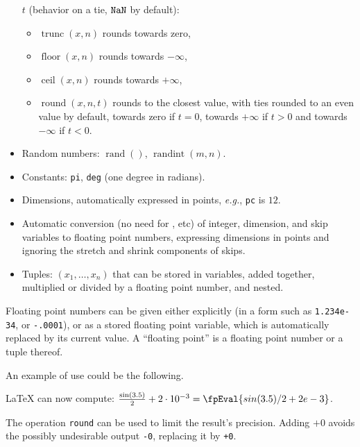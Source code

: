 \documentclass[oneside]{book}
\begin{document}
\begin{itemize}
$t$ (behavior on a tie, $\texttt{NaN}$ by default):
\begin{itemize}
\item $\operatorname{trunc}(x,n)$ rounds towards zero,
\item $\operatorname{floor}(x,n)$ rounds towards $-\infty$,
\item $\operatorname{ceil}(x,n)$ rounds towards $+\infty$,
\item $\operatorname{round}(x,n,t)$ rounds to the closest value, with
ties rounded to an even value by default, towards zero if $t=0$,
towards $+\infty$ if $t>0$ and towards $-\infty$ if $t<0$.
\end{itemize}
\item Random numbers: $\mathop{rand}()$, $\mathop{randint}(m,n)$.
\item Constants: \texttt{pi}, \texttt{deg} (one degree in radians).
\item Dimensions, automatically expressed in points, \emph{e.g.},
\texttt{pc} is $12$.
\item Automatic conversion (no need for , etc) of
integer, dimension, and skip variables to floating point numbers,
expressing dimensions in points and ignoring the stretch and
shrink components of skips.
\item Tuples: $(x_1,\ldots{},x_n)$ that can be stored in variables,
added together, multiplied or divided by a floating point number,
and nested.
\end{itemize}
Floating point numbers can be given either explicitly (in a form such
as \verb|1.234e-34|, or \verb|-.0001|), or as a stored floating point variable,
which is automatically replaced by its current value.
A \enquote{floating point} is a floating point number or a tuple thereof.

An example of use could be the following.
\begin{demohigh}
\LaTeX{} can now compute: $ \frac{\sin(3.5)}{2} + 2\cdot 10^{-3}
= \fpEval {sin(3.5)/2 + 2e-3} $.
\end{demohigh}

The operation \texttt{round} can be used to limit the result's
precision. Adding $+0$ avoids the possibly undesirable output \verb|-0|,
replacing it by \verb|+0|.
\end{document}

